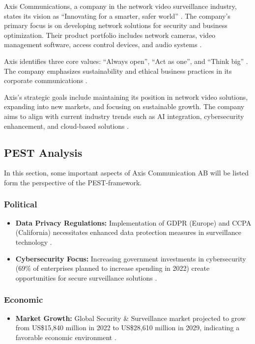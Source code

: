\documentclass{article}
\begin{document}
Axis Communications, a company in the network video surveillance industry, states its vision as \enquote{Innovating for a smarter, safer world} \cite{axis_about}. The company's primary focus is on developing network solutions for security and business optimization. Their product portfolio includes network cameras, video management software, access control devices, and audio systems \cite{axis_about, axis_homepage}. 

Axis identifies three core values: \enquote{Always open}, \enquote{Act as one}, and \enquote{Think big} \cite{axis_sustainability2023}. The company emphasizes sustainability and ethical business practices in its corporate communications \cite{axis_sustainability2023}. 

Axis's strategic goals include maintaining its position in network video solutions, expanding into new markets, and focusing on sustainable growth. The company aims to align with current industry trends such as AI integration, cybersecurity enhancement, and cloud-based solutions \cite{axis_trends2022}.


\subsection{PEST Analysis}
In this section, some important aspects of Axis Communication AB will be listed form the perspective of the PEST-framework.

\subsubsection{Political}
\begin{itemize}
    \item \textbf{Data Privacy Regulations:} Implementation of GDPR (Europe) and CCPA (California) necessitates enhanced data protection measures in surveillance technology \cite{iapp2023}.
    \item \textbf{Cybersecurity Focus:} Increasing government investments in cybersecurity (69\% of enterprises planned to increase spending in 2022) create opportunities for secure surveillance solutions \cite{aipix2023}.
\end{itemize}

\subsubsection{Economic}
\begin{itemize}
    \item \textbf{Market Growth:} Global Security \& Surveillance market projected to grow from US\$15,840 million in 2022 to US\$28,610 million in 2029, indicating a favorable economic environment \cite{mckinsey2023}.
\end{itemize}
\end{document}

